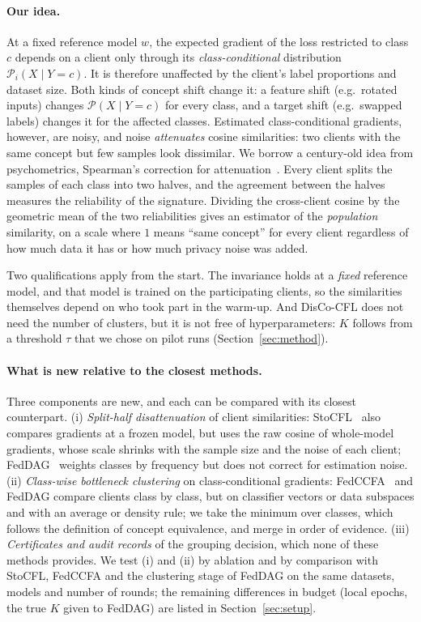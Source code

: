 \documentclass[pdflatex,sn-apa]{sn-jnl}
\theoremstyle{thmstyleone}
\theoremstyle{thmstylethree}
\newcommand{\cP}{\mathcal{P}}
\begin{document}
\paragraph{Our idea.} At a fixed reference model $w$, the expected gradient of the loss restricted to class $c$ depends on a client only through its \emph{class-conditional} distribution $\cP_i(X\mid Y=c)$. It is therefore unaffected by the client's label proportions and dataset size. Both kinds of concept shift change it: a feature shift (e.g.\ rotated inputs) changes $\cP(X\mid Y=c)$ for every class, and a target shift (e.g.\ swapped labels) changes it for the affected classes. Estimated class-conditional gradients, however, are noisy, and noise \emph{attenuates} cosine similarities: two clients with the same concept but few samples look dissimilar. We borrow a century-old idea from psychometrics, Spearman's correction for attenuation~\citep{spearman1904,spearman1910,brown1910}. Every client splits the samples of each class into two halves, and the agreement between the halves measures the reliability of the signature. Dividing the cross-client cosine by the geometric mean of the two reliabilities gives an estimator of the \emph{population} similarity, on a scale where $1$ means ``same concept'' for every client regardless of how much data it has or how much privacy noise was added.

Two qualifications apply from the start. The invariance holds at a \emph{fixed} reference model, and that model is trained on the participating clients, so the similarities themselves depend on who took part in the warm-up. And DisCo-CFL does not need the number of clusters, but it is not free of hyperparameters: $K$ follows from a threshold $\tau$ that we chose on pilot runs (Section~\ref{sec:method}).

\paragraph{What is new relative to the closest methods.} Three components are new, and each can be compared with its closest counterpart. (i) \emph{Split-half disattenuation} of client similarities: StoCFL~\citep{zeng2025stocfl} also compares gradients at a frozen model, but uses the raw cosine of whole-model gradients, whose scale shrinks with the sample size and the noise of each client; FedDAG~\citep{pramanik2026feddag} weights classes by frequency but does not correct for estimation noise. (ii) \emph{Class-wise bottleneck clustering} on class-conditional gradients: FedCCFA~\citep{chen2024fedccfa} and FedDAG compare clients class by class, but on classifier vectors or data subspaces and with an average or density rule; we take the minimum over classes, which follows the definition of concept equivalence, and merge in order of evidence. (iii) \emph{Certificates and audit records} of the grouping decision, which none of these methods provides. We test (i) and (ii) by ablation and by comparison with StoCFL, FedCCFA and the clustering stage of FedDAG on the same datasets, models and number of rounds; the remaining differences in budget (local epochs, the true $K$ given to FedDAG) are listed in Section~\ref{sec:setup}.
\end{document}
